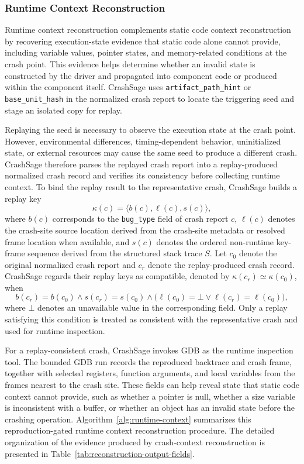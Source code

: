 \documentclass[pdflatex,sn-basic]{sn-jnl}%
\theoremstyle{thmstyleone}%
\theoremstyle{thmstyletwo}%
\theoremstyle{thmstylethree}%
\begin{document}
\subsubsection{Runtime Context Reconstruction}
Runtime context reconstruction complements static code context reconstruction by recovering execution-state evidence that static code alone cannot provide, including variable values, pointer states, and memory-related conditions at the crash point.
This evidence helps determine whether an invalid state is constructed by the driver and propagated into component code or produced within the component itself.
CrashSage uses \texttt{artifact\_path\_hint} or \texttt{base\_unit\_hash} in the normalized crash report to locate the triggering seed and stage an isolated copy for replay.

Replaying the seed is necessary to observe the execution state at the crash point.
However, environmental differences, timing-dependent behavior, uninitialized state, or external resources may cause the same seed to produce a different crash.
CrashSage therefore parses the replayed crash report into a replay-produced normalized crash record and verifies its consistency before collecting runtime context.
To bind the replay result to the representative crash, CrashSage builds a replay key
\begin{equation*}
\kappa(c)=\langle b(c), \ell(c), s(c) \rangle ,
\end{equation*}
where \(b(c)\) corresponds to the \texttt{bug\_type} field of crash report \(c\), \(\ell(c)\) denotes the crash-site source location derived from the crash-site metadata or resolved frame location when available, and \(s(c)\) denotes the ordered non-runtime key-frame sequence derived from the structured stack trace \(S\).
Let \(c_0\) denote the original normalized crash report and \(c_r\) denote the replay-produced crash record.
CrashSage regards their replay keys as compatible, denoted by \(\kappa(c_r)\simeq\kappa(c_0)\), when
\begin{equation*}
b(c_r)=b(c_0) \land s(c_r)=s(c_0) \land
\bigl(\ell(c_0)=\bot \lor \ell(c_r)=\ell(c_0)\bigr),
\end{equation*}
where \(\bot\) denotes an unavailable value in the corresponding field.
Only a replay satisfying this condition is treated as consistent with the representative crash and used for runtime inspection.

For a replay-consistent crash, CrashSage invokes GDB as the runtime inspection tool.
The bounded GDB run records the reproduced backtrace and crash frame, together with selected registers, function arguments, and local variables from the frames nearest to the crash site.
These fields can help reveal state that static code context cannot provide, such as whether a pointer is null, whether a size variable is inconsistent with a buffer, or whether an object has an invalid state before the crashing operation. Algorithm~\ref{alg:runtime-context} summarizes this reproduction-gated runtime context reconstruction procedure. The detailed organization of the evidence produced by crash-context reconstruction is presented in Table~\ref{tab:reconstruction-output-fields}.
\end{document}
